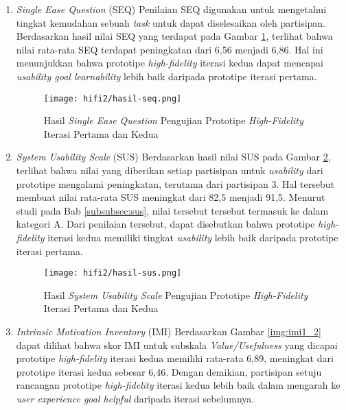
\begin{enumerate}
  \item \textit{Single Ease Question} (SEQ)
  \subitem  Penilaian SEQ digunakan untuk mengetahui tingkat kemudahan sebuah \textit{task} untuk dapat diselesaikan oleh partisipan. Berdasarkan hasil nilai SEQ yang terdapat pada Gambar \ref{img:seq_2}, terlihat bahwa nilai rata-rata SEQ terdapat peningkatan dari 6,56 menjadi 6,86. Hal ini menunjukkan bahwa prototipe \textit{high-fidelity} iterasi kedua dapat mencapai \textit{usability goal learnability} lebih baik daripada prototipe iterasi pertama. 

  \begin{figure}[h]
    \centering
    \texttt{[image: hifi2/hasil-seq.png]}
    \caption{Hasil \textit{Single Ease Question} Pengujian Prototipe \textit{High-Fidelity} Iterasi Pertama dan Kedua}
    \label{img:seq_2}
  \end{figure}
  \FloatBarrier

  \item \textit{System Usability Scale} (SUS)
  \subitem  Berdasarkan hasil nilai SUS pada Gambar \ref{img:sus_2}, terlihat bahwa nilai yang diberikan setiap partisipan untuk \textit{usability} dari prototipe mengalami peningkatan, terutama dari partisipan 3. Hal tersebut membuat nilai rata-rata SUS meningkat dari 82,5 menjadi 91,5. Menurut studi pada Bab \ref{subsubsec:sus}, nilai tersebut tersebut termasuk ke dalam kategori A. Dari penilaian tersebut, dapat disebutkan bahwa prototipe \textit{high-fidelity} iterasi kedua memiliki tingkat \textit{usability} lebih baik daripada prototipe iterasi pertama.

  \begin{figure}[h]
    \centering
    \texttt{[image: hifi2/hasil-sus.png]}
    \caption{Hasil \textit{System Usability Scale} Pengujian Prototipe \textit{High-Fidelity} Iterasi Pertama dan Kedua}
    \label{img:sus_2}
  \end{figure}
  \FloatBarrier

  \item \textit{Intrinsic Motivation Inventory} (IMI)
  \subitem  Berdasarkan Gambar \ref{img:imi1_2} dapat dilihat bahwa skor IMI untuk subskala \textit{Value/Usefulness} yang dicapai prototipe \textit{high-fidelity} iterasi kedua memiliki rata-rata 6,89, meningkat dari prototipe iterasi kedua sebesar 6,46. Dengan demikian, partisipan setuju rancangan prototipe \textit{high-fidelity} iterasi kedua lebih baik dalam mengarah ke \textit{user experience goal helpful} daripada iterasi sebelumnya.
  

\end{enumerate}
